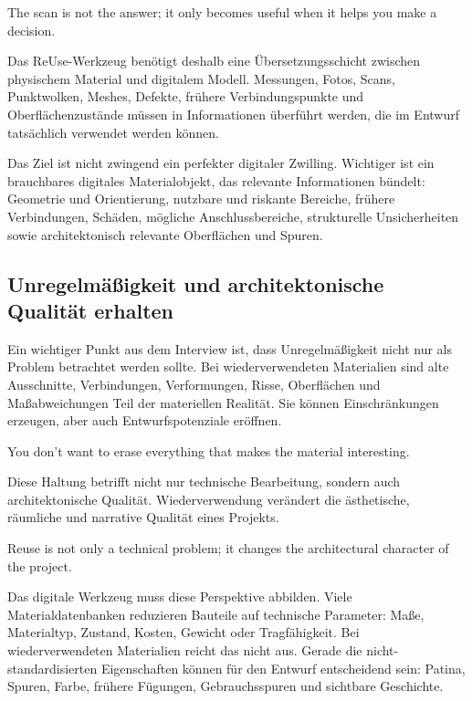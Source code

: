 \begin{Blockquote}
The scan is not the answer; it only becomes useful when it helps you make a decision.
\end{Blockquote}

Das ReUse-Werkzeug benötigt deshalb eine Übersetzungsschicht zwischen physischem Material und digitalem Modell. Messungen, Fotos, Scans, Punktwolken, Meshes, Defekte, frühere Verbindungspunkte und Oberflächenzustände müssen in Informationen überführt werden, die im Entwurf tatsächlich verwendet werden können.

Das Ziel ist nicht zwingend ein perfekter digitaler Zwilling. Wichtiger ist ein brauchbares digitales Materialobjekt, das relevante Informationen bündelt: Geometrie und Orientierung, nutzbare und riskante Bereiche, frühere Verbindungen, Schäden, mögliche Anschlussbereiche, strukturelle Unsicherheiten sowie architektonisch relevante Oberflächen und Spuren.

\subsection{Unregelmäßigkeit und architektonische Qualität erhalten}

Ein wichtiger Punkt aus dem Interview ist, dass Unregelmäßigkeit nicht nur als Problem betrachtet werden sollte. Bei wiederverwendeten Materialien sind alte Ausschnitte, Verbindungen, Verformungen, Risse, Oberflächen und Maßabweichungen Teil der materiellen Realität. Sie können Einschränkungen erzeugen, aber auch Entwurfspotenziale eröffnen.

\begin{Blockquote}
You don't want to erase everything that makes the material interesting.
\end{Blockquote}

Diese Haltung betrifft nicht nur technische Bearbeitung, sondern auch architektonische Qualität. Wiederverwendung verändert die ästhetische, räumliche und narrative Qualität eines Projekts.

\begin{Blockquote}
Reuse is not only a technical problem; it changes the architectural character of the project.
\end{Blockquote}

Das digitale Werkzeug muss diese Perspektive abbilden. Viele Materialdatenbanken reduzieren Bauteile auf technische Parameter: Maße, Materialtyp, Zustand, Kosten, Gewicht oder Tragfähigkeit. Bei wiederverwendeten Materialien reicht das nicht aus. Gerade die nicht-standardisierten Eigenschaften können für den Entwurf entscheidend sein: Patina, Spuren, Farbe, frühere Fügungen, Gebrauchsspuren und sichtbare Geschichte.

